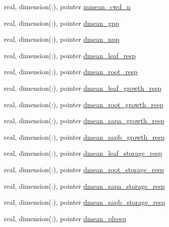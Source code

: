 \begin{DoxyCompactItemize}
\item 
real, dimension(\+:), pointer \hyperlink{structed__state__vars_1_1edtype_a117b12775b520ff04041c1aa785a2fe2}{mmean\+\_\+cwd\+\_\+n}
\item 
real, dimension(\+:), pointer \hyperlink{structed__state__vars_1_1edtype_a5a8c209b1a99f87526f78648b34edb17}{dmean\+\_\+gpp}
\item 
real, dimension(\+:), pointer \hyperlink{structed__state__vars_1_1edtype_a4b4e0500a94bdecf3f41df98ceaa9340}{dmean\+\_\+npp}
\item 
real, dimension(\+:), pointer \hyperlink{structed__state__vars_1_1edtype_a175c8795c81b68c4b9bfd4969123bd03}{dmean\+\_\+leaf\+\_\+resp}
\item 
real, dimension(\+:), pointer \hyperlink{structed__state__vars_1_1edtype_a60cc033927517b83b34f0ab0e6ca65d0}{dmean\+\_\+root\+\_\+resp}
\item 
real, dimension(\+:), pointer \hyperlink{structed__state__vars_1_1edtype_ab2e3bca1a9cec928d19783e68070b640}{dmean\+\_\+leaf\+\_\+growth\+\_\+resp}
\item 
real, dimension(\+:), pointer \hyperlink{structed__state__vars_1_1edtype_a906fd04b336f2771165b641f6db13162}{dmean\+\_\+root\+\_\+growth\+\_\+resp}
\item 
real, dimension(\+:), pointer \hyperlink{structed__state__vars_1_1edtype_a170f852418939d344b71dc088898d2c6}{dmean\+\_\+sapa\+\_\+growth\+\_\+resp}
\item 
real, dimension(\+:), pointer \hyperlink{structed__state__vars_1_1edtype_a1f0f2714ba145d9f00c86edc42a17d06}{dmean\+\_\+sapb\+\_\+growth\+\_\+resp}
\item 
real, dimension(\+:), pointer \hyperlink{structed__state__vars_1_1edtype_a8e6fa4c352d46465e4f8e814fd6ffec0}{dmean\+\_\+leaf\+\_\+storage\+\_\+resp}
\item 
real, dimension(\+:), pointer \hyperlink{structed__state__vars_1_1edtype_ac31702dc500b31fa634f1dd169c07b64}{dmean\+\_\+root\+\_\+storage\+\_\+resp}
\item 
real, dimension(\+:), pointer \hyperlink{structed__state__vars_1_1edtype_af38ef89a15d058e9ef0ecac61915a0e8}{dmean\+\_\+sapa\+\_\+storage\+\_\+resp}
\item 
real, dimension(\+:), pointer \hyperlink{structed__state__vars_1_1edtype_a1128459f0cd84e639d459692c1df3b9a}{dmean\+\_\+sapb\+\_\+storage\+\_\+resp}
\item 
real, dimension(\+:), pointer \hyperlink{structed__state__vars_1_1edtype_a352c32f170130bb6207ef0a1b968aa81}{dmean\+\_\+plresp}

\end{DoxyCompactItemize}
